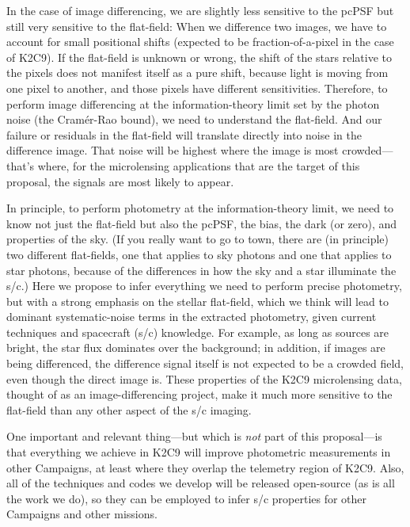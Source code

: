 \documentclass[12pt,preprint]{aastex}
\begin{document}
In the case of image differencing, we are slightly less sensitive to the
pcPSF but still very sensitive to the flat-field:
When we difference two images, we have to account for small positional
shifts (expected to be fraction-of-a-pixel in the case of K2C9).
If the flat-field is unknown or wrong, the shift of the stars relative
to the pixels does not manifest itself as a pure shift, because light
is moving from one pixel to another, and those pixels have different
sensitivities.
Therefore, to perform image differencing at the information-theory
limit set by the photon noise (the Cram\'er-Rao bound), we need to
understand the flat-field.
And our failure or residuals in the flat-field will translate directly
into noise in the difference image.
That noise will be highest where the image is most crowded---that's where, for
the microlensing applications that are the target of this proposal,
the signals are most likely to appear.

In principle, to perform photometry at the information-theory limit,
we need to know not just the flat-field but also the pcPSF, the bias,
the dark (or zero), and properties of the sky.
(If you really want to go to town, there are (in principle) two different
flat-fields, one that applies to sky photons and one that applies to star photons,
because of the differences in how the sky and a star illuminate the
s/c.)
Here we propose to infer everything we need to perform precise
photometry, but with a strong emphasis on the stellar flat-field, which we
think will lead to dominant systematic-noise terms in the extracted
photometry, given current techniques and spacecraft (s/c) knowledge.
For example, as long as sources are bright, the star flux dominates
over the background; in addition, if images are being differenced, the
difference signal itself is not expected to be a crowded field, even though
the direct image is.
These properties of the K2C9 microlensing data, thought of as an
image-differencing project, make it much more sensitive to the flat-field than
any other aspect of the s/c imaging.

One important and relevant thing---but which is \emph{not} part of this
proposal---is that everything we achieve in K2C9 will improve photometric
measurements in other Campaigns, at least where they overlap the
telemetry region of K2C9.
Also, all of the techniques and codes we develop will be released
open-source (as is all the work we do), so they can be employed to
infer s/c properties for other Campaigns and other missions.
\end{document}
